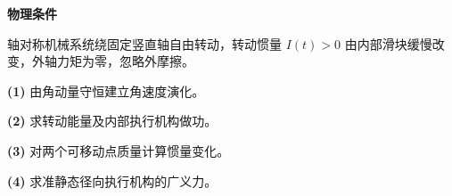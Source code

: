 \textbf{物理条件}\par 轴对称机械系统绕固定竖直轴自由转动，转动惯量 \(I(t)>0\) 由内部滑块缓慢改变，外轴力矩为零，忽略外摩擦。
\par\noindent\textbf{(1)} 由角动量守恒建立角速度演化。
\par\noindent\textbf{(2)} 求转动能量及内部执行机构做功。
\par\noindent\textbf{(3)} 对两个可移动点质量计算惯量变化。
\par\noindent\textbf{(4)} 求准静态径向执行机构的广义力。
